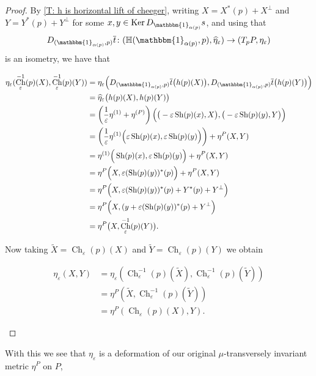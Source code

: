 \documentclass[12pt,a4paper,reqno]{amsart}
\DeclareMathOperator{\Ch}{Ch}
\DeclareMathOperator{\kernel}{Ker}
\DeclareMathOperator{\Sh}{Sh} %
\newcommand{\1}{\mathbbm{1}} %
\newcommand{\Hor}{\mathbb{H}} %
\theoremstyle{definition}
\theoremstyle{TheoremNum}
\begin{document}
\begin{proof}
By \th\ref{T: h is horizontal lift of cheeger}, writing $X=X^\ast(p)+X^\perp$ and $Y= Y^\ast(p)+Y^\perp$ for some $x,y\in \kernel D_{\1_{\alpha(p)}}s$, and using that \[
D_{(\1_{\alpha(p)},p)}\overline{t}\colon (\Hor(\1_{\alpha(p)},p),\widehat{\eta}_\varepsilon) \to (T_p P,\eta_\varepsilon)
\]
is an isometry, we have that 
\begin{linenomath}
\begin{align*}
\eta_\varepsilon(\Ch^{-1}_\varepsilon(p)(X),\Ch^{-1}_\varepsilon(p)(Y)) &= \eta_\varepsilon\Big(D_{(\1_{\alpha(p)},p)}\overline{t}\big(h(p)(X)\big),D_{(\1_{\alpha(p)},p)}\overline{t}\big(h(p)(Y)\big)\Big)\\
&= \widehat{\eta}_\varepsilon \big(h(p)(X),h(p)(Y)\big)\\
&= \left(\frac{1}{\varepsilon}\eta^{(1)}+\eta^{(P)}\right)\Big(\big(-\varepsilon\Sh(p)(x),X\big),\big(-\varepsilon\Sh(p)(y),Y\big)\Big)\\
& = \left(\frac{1}{\varepsilon}\eta^{(1)}\Big(\varepsilon\Sh(p)(x),\varepsilon\Sh(p)(y)\Big)\right)+\eta^P(X,Y)\\
& = \eta^{(1)}\Big(\Sh(p)(x),\varepsilon\Sh(p)(y)\Big)+\eta^P (X,Y)\\
&= \eta^P\Big(X,\varepsilon(\Sh(p)(y))^\ast(p)\Big)+\eta^P(X,Y)\\
& = \eta^P\Big(X,\varepsilon(\Sh(p)(y))^\ast(p)+Y^\ast(p)+Y^\perp\Big)\\
& = \eta^P\Big(X,(y+\varepsilon(\Sh(p)(y))^\ast(p)+Y^\perp\Big)\\
&= \eta^P\big(X,\Ch^{-1}_\varepsilon(p)(Y)\big).
\end{align*}
\end{linenomath}
Now taking $\tilde{X}= \Ch_\varepsilon(p)(X)$ and $\tilde{Y} = \Ch_\varepsilon(p)(Y)$ we obtain
\begin{linenomath}
\begin{align*}
\eta_\varepsilon(X,Y) &= \eta_\varepsilon(\Ch^{-1}_\varepsilon(p)(\tilde{X}),\Ch^{-1}_\varepsilon(p)(\tilde{Y}))\\
&= \eta^P(\tilde{X},\Ch^{-1}_\varepsilon(p)(\tilde{Y}))\\
& = \eta^P(\Ch_\varepsilon(p)(X),Y).
\end{align*}
\end{linenomath}
\end{proof}

With this we see that $\eta_\varepsilon$ is a deformation of our original $\mu$-transversely invariant metric $\eta^{P}$ on $P$,
\end{document}

